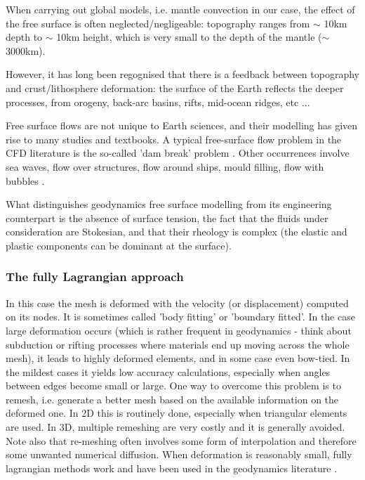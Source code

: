 

When carrying out global models, i.e.  mantle convection in our case, the effect of the free surface
is often neglected/negligeable: topography ranges from $\sim$ 10km depth to $\sim$ 10km height, which 
is very small to the depth of the mantle ($\sim$ 3000km). 

However, it has long been regognised that there is a feedback between topography and crust/lithosphere
deformation: the surface of the Earth reflects the deeper processes, from orogeny, back-arc basins, 
rifts, mid-ocean ridges, etc ...

Free surface flows are not unique to Earth sciences, and their modelling has given rise to many studies 
and textbooks. A typical free-surface flow problem in the CFD literature is the so-called 'dam break' 
problem \cite{moeb99,bacp07,liir07,lemx08,homa09,anco09}. Other occurrences involve 
sea waves, flow over structures, flow around ships, mould filling, flow with bubbles \cite{liir07}.

 
What distinguishes geodynamics free surface modelling from its engineering 
counterpart is the absence of surface tension, the fact that the fluids under consideration are
Stokesian, and that their rheology is complex (the elastic and plastic components can be 
dominant at the surface).


\subsubsection{The fully Lagrangian approach}

In this case the mesh is deformed with the velocity (or displacement) computed on its nodes. 
It is sometimes called 'body fitting' \cite{crsg12} or 'boundary fitted'. 
In the case large deformation occurs (which is rather frequent in geodynamics - 
think about subduction or rifting processes where materials end up moving across the whole mesh),
it leads to highly deformed elements, and in some case even bow-tied. 
In the mildest cases it yields low accuracy calculations, especially when angles between edges 
become small or large. 
One way to overcome this problem is to remesh, i.e. generate a better mesh based on the 
available information on the deformed one. In 2D this is routinely done, especially when 
triangular elements are used. In 3D, multiple remeshing are very costly and it is generally
avoided.  
Note also that re-meshing often involves some form of interpolation and therefore some unwanted 
numerical diffusion. 
When deformation is reasonably small, fully lagrangian methods work and have been used in the 
geodynamics literature \cite{hach96b,mera80,labp00}.

